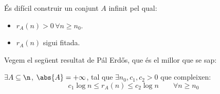 És difícil construir un conjunt $A$ infinit pel qual:

\begin{itemize}
    \item $r_A(n) > 0 \, \forall n \geq n_0$.
    \item $r_A(n)$ sigui fitada.
\end{itemize}

Vegem el següent resultat de Pál Erd{\H o}s, que és el millor que se sap:

\begin{thm}[(Erd{\H o}s)]
  $\exists A\subseteq \n$, $\abs{A} = +\infty$, tal que $\exists n_0, c_1, c_2 > 0$ que compleixen:
  \[
    c_1\log n \leq r_A(n) \leq c_2\log n \qquad \forall n\geq n_0
  \]
\end{thm}
